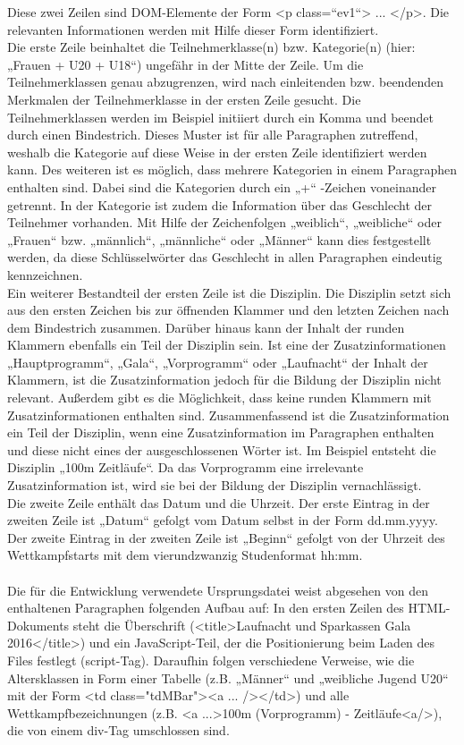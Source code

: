 Diese zwei Zeilen sind DOM-Elemente der Form <p class=“ev1“> ... </p>. Die relevanten Informationen werden mit Hilfe dieser Form identifiziert. \\
Die erste Zeile beinhaltet die Teilnehmerklasse(n) bzw. Kategorie(n) (hier: „Frauen + U20 + U18“) ungefähr in der Mitte der Zeile. Um die Teilnehmerklassen genau abzugrenzen, wird nach einleitenden bzw. beendenden Merkmalen der Teilnehmerklasse in der ersten Zeile gesucht. Die Teilnehmerklassen werden im Beispiel initiiert durch ein Komma und beendet durch einen Bindestrich. Dieses Muster ist für alle Paragraphen zutreffend, weshalb die Kategorie auf diese Weise in der ersten Zeile identifiziert werden kann. Des weiteren ist es möglich, dass mehrere Kategorien in einem Paragraphen enthalten sind. Dabei sind die Kategorien durch ein „+“ -Zeichen voneinander getrennt. 
In der Kategorie ist zudem die Information über das Geschlecht der Teilnehmer vorhanden. Mit Hilfe der Zeichenfolgen „weiblich“, „weibliche“ oder „Frauen“ bzw. „männlich“, „männliche“ oder „Männer“ kann dies festgestellt werden, da diese Schlüsselwörter das Geschlecht in allen Paragraphen eindeutig kennzeichnen. \\
Ein weiterer Bestandteil der ersten Zeile ist die Disziplin. Die Disziplin setzt sich aus den ersten Zeichen bis zur öffnenden Klammer und den letzten Zeichen nach dem Bindestrich zusammen.
Darüber hinaus kann der Inhalt der runden Klammern ebenfalls ein Teil der Disziplin sein. Ist eine der Zusatzinformationen „Hauptprogramm“, „Gala“, „Vorprogramm“ oder „Laufnacht“ der Inhalt der Klammern, ist die Zusatzinformation jedoch für die Bildung der Disziplin nicht relevant. Außerdem gibt es die Möglichkeit, dass keine runden Klammern mit Zusatzinformationen enthalten sind. Zusammenfassend ist die Zusatzinformation ein Teil der Disziplin, wenn eine Zusatzinformation im Paragraphen enthalten und diese nicht eines der ausgeschlossenen Wörter ist.
Im Beispiel entsteht die Disziplin „100m Zeitläufe“. Da das Vorprogramm eine irrelevante Zusatzinformation ist, wird sie bei der Bildung der Disziplin vernachlässigt.
\\
Die zweite Zeile enthält das Datum und die Uhrzeit. Der erste Eintrag in der zweiten Zeile ist „Datum“ gefolgt vom Datum selbst in der Form dd.mm.yyyy. Der zweite Eintrag in der zweiten Zeile ist „Beginn“ gefolgt von der Uhrzeit des Wettkampfstarts mit dem vierundzwanzig Studenformat hh:mm.\\
\\
Die für die Entwicklung verwendete Ursprungsdatei weist abgesehen von den enthaltenen Paragraphen folgenden Aufbau auf: In den ersten Zeilen des HTML-Dokuments steht die Überschrift (<title>Laufnacht und Sparkassen Gala 2016</title>) und ein JavaScript-Teil, der die Positionierung beim Laden des Files festlegt (script-Tag). Daraufhin folgen verschiedene Verweise, wie die Altersklassen in Form einer Tabelle (z.B. „Männer“ und „weibliche Jugend U20“ mit der Form <td class="tdMBar"><a ... /></td>) und alle Wettkampfbezeichnungen (z.B. <a ...>100m (Vorprogramm) - Zeitläufe<a/>), die von einem div-Tag umschlossen sind. 
